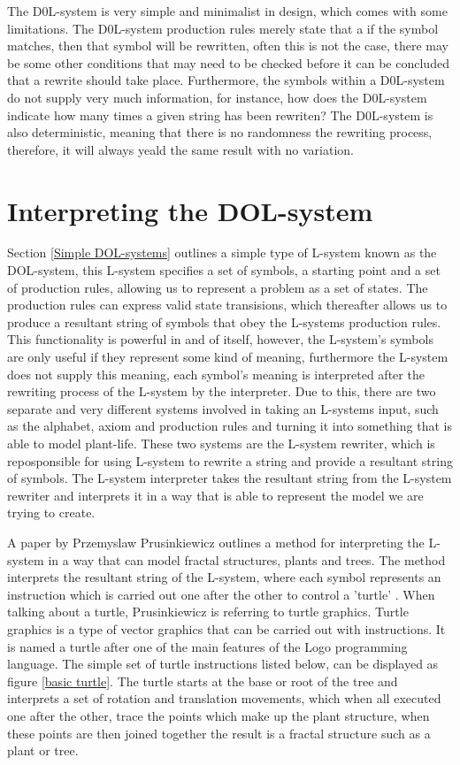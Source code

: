 The D0L-system is very simple and minimalist in design, which comes with some limitations. The D0L-system production rules merely state that a if the symbol matches, then that symbol will be rewritten, often this is not the case, there may be some other conditions that may need to be checked before it can be concluded that a rewrite should take place. Furthermore, the symbols within a D0L-system do not supply very much information, for instance, how does the D0L-system indicate how many times a given string has been rewriten? The D0L-system is also deterministic, meaning that there is no randomness the rewriting process, therefore, it will always yeald the same result with no variation.

\section{Interpreting the DOL-system} \label{Interpreting DOL-system}

Section \ref{Simple DOL-systems} outlines a simple type of L-system known as the DOL-system, this L-system specifies a set of symbols, a starting point and a set of production rules, allowing us to represent a problem as a set of states. The production rules can express valid state transisions, which thereafter allows us to produce a resultant string of symbols that obey the L-systems production rules. This functionality is powerful in and of itself, however, the L-system's symbols are only useful if they represent some kind of meaning, furthermore the L-system does not supply this meaning, each symbol's meaning is interpreted after the rewriting process of the L-system by the interpreter. Due to this, there are two separate and very different systems involved in taking an L-systems input, such as the alphabet, axiom and production rules and turning it into something that is able to model plant-life. These two systems are the L-system rewriter, which is reposponsible for using L-system to rewrite a string and provide a resultant string of symbols. The L-system interpreter takes the resultant string from the L-system rewriter and interprets it in a way that is able to represent the model we are trying to create. 

A paper by Przemyslaw Prusinkiewicz outlines a method for interpreting the L-system in a way that can model fractal structures, plants and trees. The method interprets the resultant string of the L-system, where each symbol represents an instruction which is carried out one after the other to control a 'turtle' \cite{prusinkiewicz1986graphical}. When talking about a turtle, Prusinkiewicz is referring to turtle graphics. Turtle graphics is a type of vector graphics that can be carried out with instructions. It is named a turtle after one of the main features of the Logo programming language. The simple set of turtle instructions listed below, can be displayed as figure \ref{basic turtle}. The turtle starts at the base or root of the tree and interprets a set of rotation and translation movements, which when all executed one after the other, trace the points which make up the plant structure, when these points are then joined together the result is a fractal structure such as a plant or tree.

